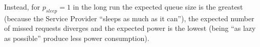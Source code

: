 Instead, for $p_{sleep} = 1$ in the long run the expected queue size
is the greatest (because the Service Provider ``sleeps as much as it
can''), the expected number of missed requests diverges and the
expected power is the lowest (being ``as lazy as possible'' produce
less power consumption).









































